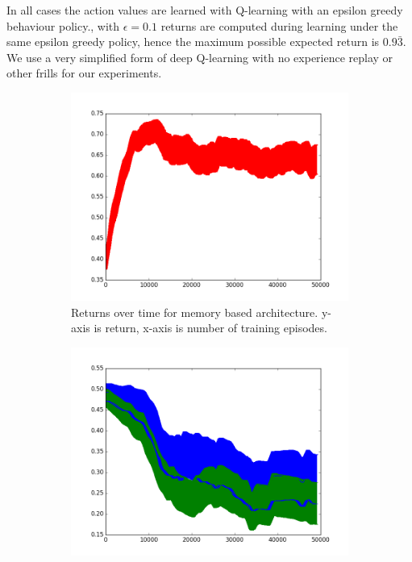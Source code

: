 \documentclass{article}
\begin{document}
In all cases the action values are learned with Q-learning with an epsilon greedy behaviour policy., with $\epsilon=0.1$ returns are computed during learning under the same epsilon greedy policy, hence the maximum possible expected return is $0.9\bar{3}$. We use a very simplified form of deep Q-learning with no experience replay or other frills for our experiments.
\begin{figure}[!ht]
\centering
\begin{subfigure}[t]{.45\textwidth}
  \centering
      \includegraphics[width=1\textwidth]{images/1_query_mem_ret.png}
  \caption{Returns over time for memory based architecture. y-axis is return, x-axis is number of training episodes.}
  \label{fig:1_query_ret}
\end{subfigure}\hfill
\begin{subfigure}[t]{.45\textwidth}
  \centering
      \includegraphics[width=1\textwidth]{images/1_query_mem_writes.png}

\end{subfigure}
\end{figure}
\end{document}
